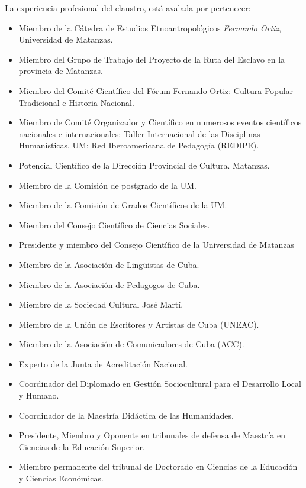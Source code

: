 La experiencia profesional del claustro, está avalada por pertenecer: 

\begin{itemize}
	\setlength\itemsep{-0.5em}
	\item Miembro de la Cátedra de Estudios Etnoantropológicos \emph{Fernando Ortiz}, Universidad de Matanzas.
	\item Miembro del Grupo de Trabajo del Proyecto de la Ruta del Esclavo en la provincia de Matanzas.
	\item Miembro del Comité Científico del Fórum Fernando Ortiz: Cultura Popular Tradicional e Historia Nacional.
	\item Miembro de Comité Organizador y Científico en numerosos eventos científicos nacionales e internacionales: Taller Internacional de las Disciplinas Humanísticas, UM; Red Iberoamericana de Pedagogía (REDIPE).
	\item Potencial Científico de la Dirección Provincial de Cultura. Matanzas.
	\item Miembro de la Comisión de postgrado de la UM.
	\item Miembro de la Comisión de Grados Científicos de la UM.
	\item Miembro del Consejo Científico de Ciencias Sociales.
	\item Presidente y miembro del Consejo Científico de la Universidad de Matanzas
	\item Miembro de la Asociación de Lingüistas de Cuba.
	\item Miembro de la Asociación de Pedagogos de Cuba.
	\item Miembro de la Sociedad Cultural José Martí.
	\item Miembro de la Unión de Escritores y Artistas de Cuba (UNEAC).
	\item Miembro de la Asociación de Comunicadores de Cuba (ACC).
	\item Experto de la Junta de Acreditación Nacional.
	\item Coordinador del Diplomado en Gestión Sociocultural para el Desarrollo Local y Humano.
	\item Coordinador de la Maestría Didáctica de las Humanidades.
	\item Presidente, Miembro y Oponente en tribunales de defensa de Maestría en Ciencias de la Educación Superior.
	\item Miembro permanente del tribunal de Doctorado en Ciencias de la Educación y Ciencias Económicas.
\end{itemize}
